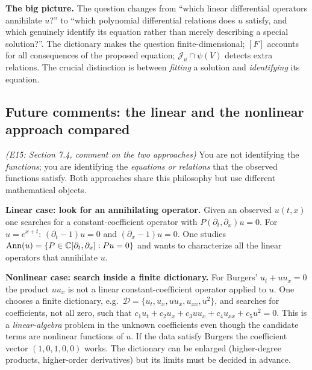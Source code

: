 \medskip\textbf{The big picture.} The question changes from ``which linear differential operators annihilate $u$?'' to ``which polynomial differential relations does $u$ satisfy, and which genuinely identify its equation rather than merely describing a special solution?''. The dictionary makes the question finite-dimensional; $[F]$ accounts for all consequences of the proposed equation; $\mathcal J_u\cap\psi(V)$ detects extra relations. The crucial distinction is between \emph{fitting} a solution and \emph{identifying} its equation.

\subsection{Future comments: the linear and the nonlinear approach compared}\label{expl:E15}
\noindent\emph{(E15: Section 7.4, comment on the two approaches)}
You are not identifying the \emph{functions}; you are identifying the \emph{equations or relations} that the observed functions satisfy. Both approaches share this philosophy but use different mathematical objects.

\medskip\textbf{Linear case: look for an annihilating operator.} Given an observed $u(t,x)$ one searches for a constant-coefficient operator with $P(\partial_t,\partial_x)u=0$. For $u=e^{x+t}$: $(\partial_t-1)u=0$ and $(\partial_x-1)u=0$. One studies $\operatorname{Ann}(u)=\{P\in\mathbb{C}[\partial_t,\partial_x]:Pu=0\}$ and wants to characterize all the linear operators that annihilate $u$.

\medskip\textbf{Nonlinear case: search inside a finite dictionary.} For Burgers' $u_t+uu_x=0$ the product $uu_x$ is not a linear constant-coefficient operator applied to $u$. One chooses a finite dictionary, e.g.\ $\mathcal D=\{u_t,u_x,uu_x,u_{xx},u^2\}$, and searches for coefficients, not all zero, such that $c_1u_t+c_2u_x+c_3uu_x+c_4u_{xx}+c_5u^2=0$. This is a \emph{linear-algebra} problem in the unknown coefficients even though the candidate terms are nonlinear functions of $u$. If the data satisfy Burgers the coefficient vector $(1,0,1,0,0)$ works. The dictionary can be enlarged (higher-degree products, higher-order derivatives) but its limits must be decided in advance.

